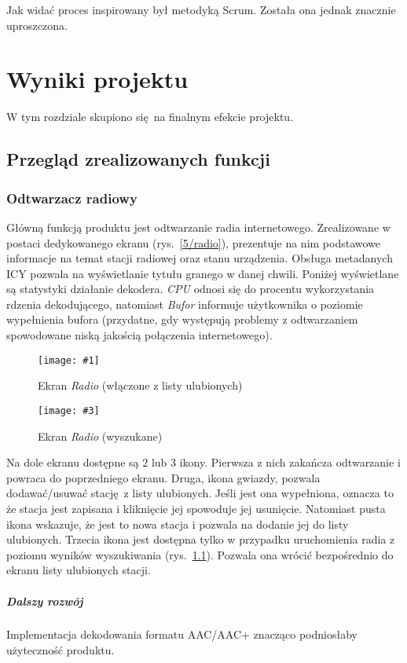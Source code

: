 \documentclass[polish]{aghengthesis}
\newcommand{\imgintss}[5]{
	\begin{figure}[{#5}]
		\centering
		\begin{minipage}{.45\textwidth}
			\centering
			\texttt{[image: \#1]}
			\caption{#2}
			\label{#1}
		\end{minipage}%
		\hfill
		\begin{minipage}{.45\textwidth}
			\centering
			\texttt{[image: \#3]}
			\caption{#4}
			\label{#3}
		\end{minipage}
	\end{figure}
}
\newcommand{\imghss}[4]{\imgintss{#1}{#2}{#3}{#4}{H}}
\begin{document}
		 Jak widać proces inspirowany był metodyką Scrum. Została ona jednak znacznie uproszczona.
	 	
\chapter{Wyniki projektu}
	W tym rozdziale skupiono się na finalnym efekcie projektu.
	
	\section{Przegląd zrealizowanych funkcji}
	
		\subsection{Odtwarzacz radiowy}			
			Główną funkcją produktu jest odtwarzanie radia internetowego. Zrealizowane w postaci dedykowanego ekranu (rys.~\ref{5/radio}), prezentuje na nim podstawowe informacje na temat stacji radiowej oraz stanu urządzenia. Obsługa metadanych ICY pozwala na wyświetlanie tytułu granego w danej chwili. Poniżej wyświetlane są statystyki działanie dekodera. \textit{CPU} odnosi się do procentu wykorzystania rdzenia dekodującego, natomiast \textit{Bufor} informuje użytkownika o poziomie wypełnienia bufora (przydatne, gdy występują problemy z odtwarzaniem spowodowane niską jakością połączenia internetowego).
			
			\imghss{5/radio}{Ekran \textit{Radio} (włączone z listy ulubionych)}{5/radio_search}{Ekran \textit{Radio} (wyszukane)}
			
			Na dole ekranu dostępne są 2 lub 3 ikony. Pierwsza z nich zakańcza odtwarzanie i powraca do poprzedniego ekranu. Druga, ikona gwiazdy, pozwala dodawać/usuwać stację z listy ulubionych. Jeśli jest ona wypełniona, oznacza to że stacja jest zapisana i kliknięcie jej spowoduje jej usunięcie. Natomiast pusta ikona wskazuje, że jest to nowa stacja i pozwala na dodanie jej do listy ulubionych. Trzecia ikona jest dostępna tylko w przypadku uruchomienia radia z poziomu wyników wyszukiwania (rys.~\ref{5/radio_search}). Pozwala ona wrócić bezpośrednio do ekranu listy ulubionych stacji.
		
			\paragraph{Dalszy rozwój}
				Implementacja dekodowania formatu AAC/AAC+ znacząco podniosłaby użyteczność produktu.
			
\end{document}
